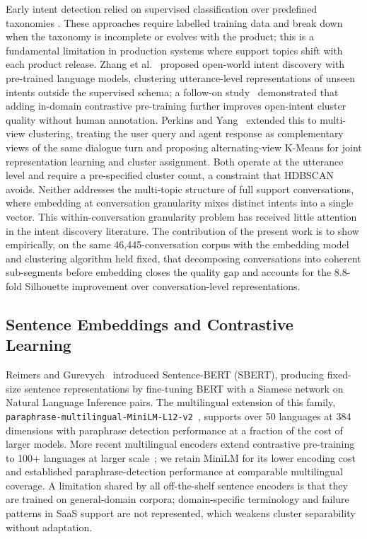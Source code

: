 \documentclass[conference]{IEEEtran}
\begin{document}
Early intent detection relied on supervised classification over predefined taxonomies \cite{liu2016attention}. These approaches require labelled training data and break down when the taxonomy is incomplete or evolves with the product; this is a fundamental limitation in production systems where support topics shift with each product release. Zhang et al.~\cite{zhang2021new} proposed open-world intent discovery with pre-trained language models, clustering utterance-level representations of unseen intents outside the supervised schema; a follow-on study~\cite{zhang2022intent} demonstrated that adding in-domain contrastive pre-training further improves open-intent cluster quality without human annotation. Perkins and Yang~\cite{perkins2019dialog} extended this to multi-view clustering, treating the user query and agent response as complementary views of the same dialogue turn and proposing alternating-view K-Means for joint representation learning and cluster assignment. Both operate at the utterance level and require a pre-specified cluster count, a constraint that HDBSCAN~\cite{campello2013density} avoids. Neither addresses the multi-topic structure of full support conversations, where embedding at conversation granularity mixes distinct intents into a single vector. This within-conversation granularity problem has received little attention in the intent discovery literature. The contribution of the present work is to show empirically, on the same 46{,}445-conversation corpus with the embedding model and clustering algorithm held fixed, that decomposing conversations into coherent sub-segments before embedding closes the quality gap and accounts for the 8.8-fold Silhouette improvement over conversation-level representations.

\subsection{Sentence Embeddings and Contrastive Learning}

Reimers and Gurevych~\cite{reimers2019sentence} introduced Sentence-BERT (SBERT), producing fixed-size sentence representations by fine-tuning BERT with a Siamese network on Natural Language Inference pairs. The multilingual extension of this family, \texttt{paraphrase-multilingual-MiniLM-L12-v2}~\cite{wang2020minilm}, supports over 50 languages at 384 dimensions with paraphrase detection performance at a fraction of the cost of larger models. More recent multilingual encoders extend contrastive pre-training to 100+ languages at larger scale~\cite{wang2024e5}; we retain MiniLM for its lower encoding cost and established paraphrase-detection performance at comparable multilingual coverage. A limitation shared by all off-the-shelf sentence encoders is that they are trained on general-domain corpora; domain-specific terminology and failure patterns in SaaS support are not represented, which weakens cluster separability without adaptation.
\end{document}

